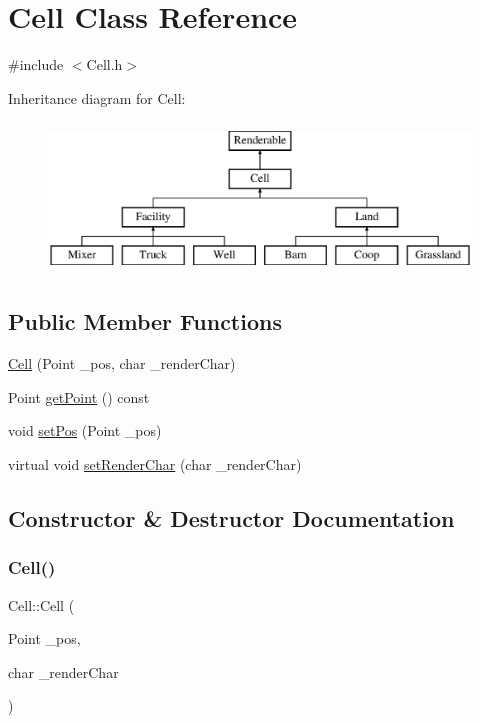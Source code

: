 \hypertarget{classCell}{}\section{Cell Class Reference}
\label{classCell}


{\ttfamily \#include $<$Cell.\+h$>$}

Inheritance diagram for Cell\+:\begin{figure}[H]
\begin{center}
\leavevmode
\includegraphics[height=4.000000cm]{classCell}
\end{center}
\end{figure}
\subsection*{Public Member Functions}
\begin{DoxyCompactItemize}
\item 
\mbox{\hyperlink{classCell_a8aff0e3bf85a1690c4424aaf28df5da0}{Cell}} (Point \+\_\+pos, char \+\_\+render\+Char)
\item 
Point \mbox{\hyperlink{classCell_adb435a236584c42c0ffc77b67e2decc7}{get\+Point}} () const
\item 
void \mbox{\hyperlink{classCell_a2bf0de61827c10b7153dcebb84b47988}{set\+Pos}} (Point \+\_\+pos)
\item 
virtual void \mbox{\hyperlink{classCell_af53171630c52051a690d6f68329ea58e}{set\+Render\+Char}} (char \+\_\+render\+Char)
\end{DoxyCompactItemize}


\subsection{Constructor \& Destructor Documentation}
\mbox{\label{classCell_a8aff0e3bf85a1690c4424aaf28df5da0}} 
\subsubsection{\texorpdfstring{Cell()}{Cell()}}
{\footnotesize\ttfamily Cell\+::\+Cell (\begin{DoxyParamCaption}\item[{Point}]{\+\_\+pos,  }\item[{char}]{\+\_\+render\+Char }\end{DoxyParamCaption})}



